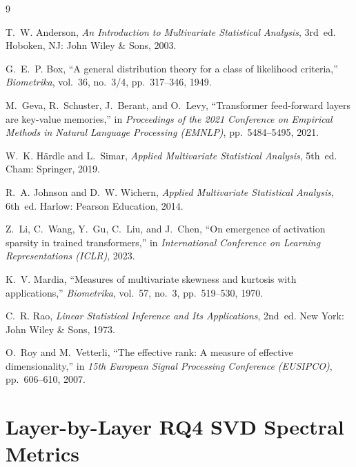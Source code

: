 \documentclass[12pt, a4paper, oneside]{report}
\theoremstyle{definition}
\begin{document}
\begin{thebibliography}{9}

T.~W. Anderson, \emph{An Introduction to Multivariate Statistical Analysis}, 3rd~ed. Hoboken, NJ: John Wiley \& Sons, 2003.

G.~E.~P. Box, ``A general distribution theory for a class of likelihood criteria,'' \emph{Biometrika}, vol.~36, no.~3/4, pp.~317--346, 1949.

M.~Geva, R.~Schuster, J.~Berant, and O.~Levy, ``Transformer feed-forward layers are key-value memories,'' in \emph{Proceedings of the 2021 Conference on Empirical Methods in Natural Language Processing (EMNLP)}, pp.~5484--5495, 2021.

W.~K. H{\"a}rdle and L.~Simar, \emph{Applied Multivariate Statistical Analysis}, 5th~ed. Cham: Springer, 2019.

R.~A. Johnson and D.~W. Wichern, \emph{Applied Multivariate Statistical Analysis}, 6th~ed. Harlow: Pearson Education, 2014.

Z.~Li, C.~Wang, Y.~Gu, C.~Liu, and J.~Chen, ``On emergence of activation sparsity in trained transformers,'' in \emph{International Conference on Learning Representations (ICLR)}, 2023.

K.~V. Mardia, ``Measures of multivariate skewness and kurtosis with applications,'' \emph{Biometrika}, vol.~57, no.~3, pp.~519--530, 1970.

C.~R. Rao, \emph{Linear Statistical Inference and Its Applications}, 2nd~ed. New York: John Wiley \& Sons, 1973.

O.~Roy and M.~Vetterli, ``The effective rank: A measure of effective dimensionality,'' in \emph{15th European Signal Processing Conference (EUSIPCO)}, pp.~606--610, 2007.

\end{thebibliography}

\appendix
\chapter{Layer-by-Layer RQ4 SVD Spectral Metrics}
\label{app:rq4_details}
\end{document}

